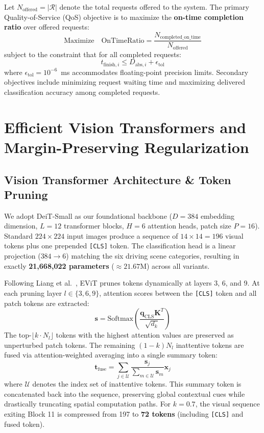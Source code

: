 \documentclass[conference]{IEEEtran}
\begin{document}
Let $N_{\text{offered}} = |\mathcal{R}|$ denote the total requests offered to the system. The primary Quality-of-Service (QoS) objective is to maximize the \textbf{on-time completion ratio} over offered requests:
\begin{equation}
\text{Maximize} \quad \text{OnTimeRatio} = \frac{N_{\text{completed\_on\_time}}}{N_{\text{offered}}}
\end{equation}
subject to the constraint that for all completed requests:
\begin{equation}
t_{\text{finish}, i} \le D_{\text{abs}, i} + \epsilon_{\text{tol}}
\end{equation}
where $\epsilon_{\text{tol}} = 10^{-6}$~ms accommodates floating-point precision limits. Secondary objectives include minimizing request waiting time and maximizing delivered classification accuracy among completed requests.

\section{Efficient Vision Transformers and Margin-Preserving Regularization}

\subsection{Vision Transformer Architecture \& Token Pruning}
We adopt DeiT-Small \cite{touvron2021training} as our foundational backbone ($D = 384$ embedding dimension, $L = 12$ transformer blocks, $H = 6$ attention heads, patch size $P = 16$). Standard $224 \times 224$ input images produce a sequence of $14 \times 14 = 196$ visual tokens plus one prepended \texttt{[CLS]} token. The classification head is a linear projection ($384 \to 6$) matching the six driving scene categories, resulting in exactly \textbf{21,668,022 parameters} ($\approx 21.67$M) across all variants.

Following Liang et al.\ \cite{liang2022not}, EViT prunes tokens dynamically at layers 3, 6, and 9. At each pruning layer $l \in \{3, 6, 9\}$, attention scores between the \texttt{[CLS]} token and all patch tokens are extracted:
\begin{equation}
\mathbf{s} = \text{Softmax}\left(\frac{\mathbf{q}_{\text{CLS}} \mathbf{K}^T}{\sqrt{d_k}}\right)
\end{equation}
The top-$\lfloor k \cdot N_l \rfloor$ tokens with the highest attention values are preserved as unperturbed patch tokens. The remaining $(1-k)N_l$ inattentive tokens are fused via attention-weighted averaging into a single summary token:
\begin{equation}
\mathbf{t}_{\text{fuse}} = \sum_{j \in \mathcal{U}} \frac{\mathbf{s}_j}{\sum_{m \in \mathcal{U}} \mathbf{s}_m} \mathbf{x}_j
\end{equation}
where $\mathcal{U}$ denotes the index set of inattentive tokens. This summary token is concatenated back into the sequence, preserving global contextual cues while drastically truncating spatial computation paths. For $k=0.7$, the visual sequence exiting Block 11 is compressed from 197 to \textbf{72 tokens} (including \texttt{[CLS]} and fused token).
\end{document}

